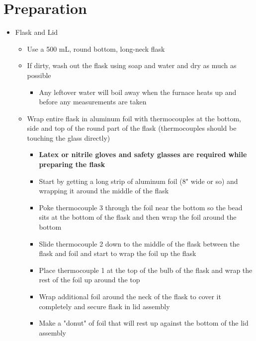 \documentclass[letterpaper,11pt]{article}
\begin{document}
\section{Preparation}
    \begin{itemize}
    \item Flask and Lid
        
        \begin{itemize}
        \item Use a 500 mL, round bottom, long-neck flask
        \item If dirty, wash out the flask using soap and water and dry as much 
            as possible
            
                \begin{itemize}
                \item Any leftover water will boil away when the furnace heats 
                up and before any measurements are taken
                \end{itemize}
                
        \item Wrap entire flask in aluminum foil with thermocouples at the 
            bottom, side and top of the round part of the flask (thermocouples 
            should be touching the glass directly) %
            
                \begin{itemize}
                \item \textbf{Latex or nitrile gloves and safety glasses are 
                    required while preparing the flask}
                \item Start by getting a long strip of aluminum foil (8" wide or 
                    so) and wrapping it around the middle of the flask
                \item Poke thermocouple 3 through the foil near the bottom so 
                    the bead sits at the bottom of the flask and then wrap the 
                    foil around the bottom
                \item Slide thermocouple 2 down to the middle of the flask 
                    between the flask and foil and start to wrap the foil up 
                    the flask
                \item Place thermocouple 1 at the top of the bulb of the flask 
                    and wrap the rest of the foil up around the top
                \item Wrap additional foil around the neck of the flask to cover 
                    it completely and secure flask in lid assembly
                \item Make a "donut" of foil that will rest up against the 
                bottom of the lid assembly
                \end{itemize}
                

\end{itemize}
\end{itemize}
\end{document}
